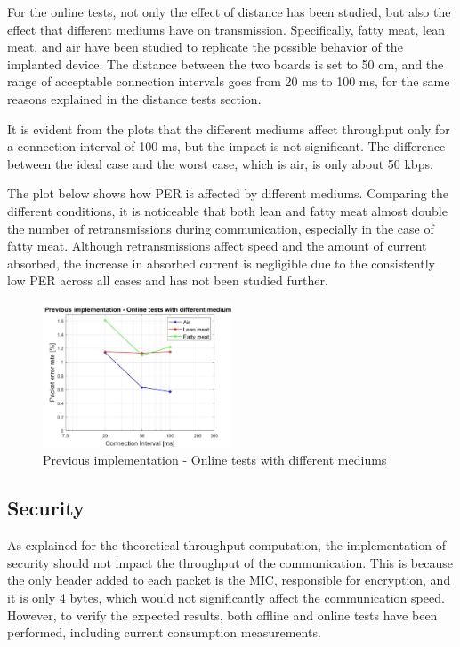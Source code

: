 \documentclass{Configuration_Files/PoliMi3i_thesis}
\begin{document}
For the online tests, not only the effect of distance has been studied, but also the effect that different mediums have on transmission. Specifically, fatty meat, lean meat, and air have been studied to replicate the possible behavior of the implanted device. The distance between the two boards is set to 50 cm, and the range of acceptable connection intervals goes from 20 ms to 100 ms, for the same reasons explained in the distance tests section.

It is evident from the plots that the different mediums affect throughput only for a connection interval of 100 ms, but the impact is not significant. The difference between the ideal case and the worst case, which is air, is only about 50 kbps.

The plot below shows how PER is affected by different mediums. Comparing the different conditions, it is noticeable that both lean and fatty meat almost double the number of retransmissions during communication, especially in the case of fatty meat. Although retransmissions affect speed and the amount of current absorbed, the increase in absorbed current is negligible due to the consistently low PER across all cases and has not been studied further.

\begin{figure}[H]
    \centering
    \includegraphics[width=0.5\textwidth]{Results Manuel/figure8}
    \caption{Previous implementation - Online tests with different mediums}
    \label{manuel_results_8}
\end{figure}

\subsection*{Security}

As explained for the theoretical throughput computation, the implementation of security should not impact the throughput of the communication. This is because the only header added to each packet is the MIC, responsible for encryption, and it is only 4 bytes, which would not significantly affect the communication speed. However, to verify the expected results, both offline and online tests have been performed, including current consumption measurements.
\end{document}
